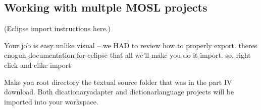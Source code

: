 \newpage
\subsection{Working with multple MOSL projects}
\texHeader
\label{sec:multiMOSL}

(Eclipse import instructions here.)

Your job is easy unlike visual -- we HAD to review how to properly export. theres enoguh documentation for eclipse that all we'll make you do it import. so,
right click and clikc import

Make you root directory the textual source folder that was in the part IV download. Both dicationaryadapter and dictionarlanguage projects will be imported into
your workspace.
